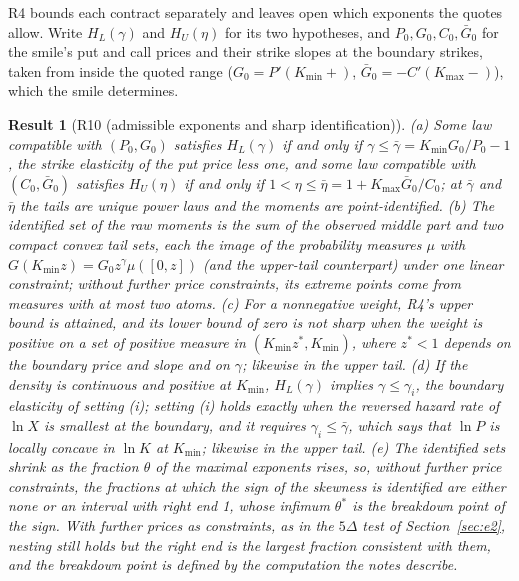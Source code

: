 \documentclass[11pt]{article}
\theoremstyle{result}
\newtheorem*{result}{Result}
\newcommand{\D}{\Delta}
\begin{document}
R4 bounds each contract separately and leaves open which exponents the quotes allow. Write $H_L(\gamma)$ and $H_U(\eta)$ for its two hypotheses, and $P_0,G_0,C_0,\bar G_0$ for the smile's put and call prices and their strike slopes at the boundary strikes, taken from inside the quoted range ($G_0=P'(K_{\min}+)$, $\bar G_0=-C'(K_{\max}-)$), which the smile determines.

\begin{result}[R10 (admissible exponents and sharp identification)]
(a) Some law compatible with $(P_0,G_0)$ satisfies $H_L(\gamma)$ if and only if $\gamma\le\bar\gamma=K_{\min}G_0/P_0-1$, the strike elasticity of the put price less one, and some law compatible with $(C_0,\bar G_0)$ satisfies $H_U(\eta)$ if and only if $1<\eta\le\bar\eta=1+K_{\max}\bar G_0/C_0$; at $\bar\gamma$ and $\bar\eta$ the tails are unique power laws and the moments are point-identified. (b) The identified set of the raw moments is the sum of the observed middle part and two compact convex tail sets, each the image of the probability measures $\mu$ with $G(K_{\min}z)=G_0z^\gamma\mu([0,z])$ (and the upper-tail counterpart) under one linear constraint; without further price constraints, its extreme points come from measures with at most two atoms. (c) For a nonnegative weight, R4's upper bound is attained, and its lower bound of zero is not sharp when the weight is positive on a set of positive measure in $(K_{\min}z^*,K_{\min})$, where $z^*<1$ depends on the boundary price and slope and on $\gamma$; likewise in the upper tail. (d) If the density is continuous and positive at $K_{\min}$, $H_L(\gamma)$ implies $\gamma\le\gamma_i$, the boundary elasticity of setting (i); setting (i) holds exactly when the reversed hazard rate of $\ln X$ is smallest at the boundary, and it requires $\gamma_i\le\bar\gamma$, which says that $\ln P$ is locally concave in $\ln K$ at $K_{\min}$; likewise in the upper tail. (e) The identified sets shrink as the fraction $\theta$ of the maximal exponents rises, so, without further price constraints, the fractions at which the sign of the skewness is identified are either none or an interval with right end 1, whose infimum $\theta^*$ is the breakdown point of the sign. With further prices as constraints, as in the $5\D$ test of Section~\ref{sec:e2}, nesting still holds but the right end is the largest fraction consistent with them, and the breakdown point is defined by the computation the notes describe.
\end{result}
\end{document}
